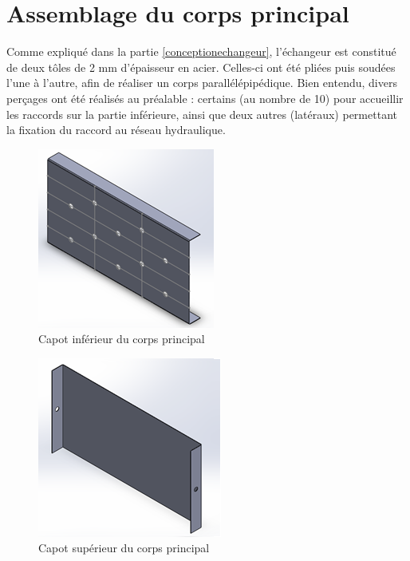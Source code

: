 \documentclass[../PS6_RapportFinal.tex]{subfiles}
\begin{document}
\graphicspath{{img/}{tex/img/}}

\section{Assemblage du corps principal}

Comme expliqué dans la partie \ref{conceptionechangeur}, l'échangeur est constitué de deux tôles de 2 mm d'épaisseur en acier. Celles-ci ont été pliées puis soudées l'une à l'autre, afin de réaliser un corps parallélépipédique. Bien entendu, divers perçages ont été réalisés au préalable : certains (au nombre de 10) pour accueillir les raccords sur la partie inférieure, ainsi que deux autres (latéraux) permettant la fixation du raccord au réseau hydraulique.

\begin{figure}[h]
\begin{center}
\includegraphics{3_1_capot_inferieur.png}
\caption[width=10cm]{Capot inférieur du corps principal}
\label{tube_aluminium} 
\end{center}
\end{figure}

\begin{figure}[h]
\begin{center}
\includegraphics{3_1_capot_superieur.png}
\caption[width=10cm]{Capot supérieur du corps principal}
\label{tube_aluminium} 
\end{center}
\end{figure}
\end{document}
